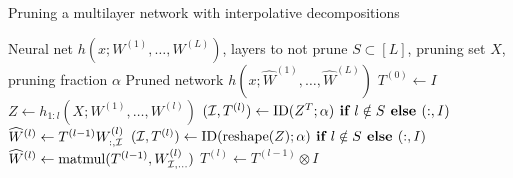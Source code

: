 \begin{algorithm}[t]{\small
\caption{Pruning a multilayer network with interpolative decompositions}
\begin{algorithmic}[1]
\label{alg:deepID}
\REQUIRE
Neural net $h(x; W^{(1)},\ldots,W^{(L)})$,
layers to not prune $S \subset [L]$,
pruning set $X$,
pruning fraction $\alpha$
\ENSURE
Pruned network $h(x; \widehat{W}^{(1)},\ldots,\widehat{W}^{(L)})$
\vspace{0.5em}
\STATE $T^{(0)} \gets I$ \;
\STATE $Z \gets h_{1:l}(X; W^{(1)}, \dots, W^{(l)})$
\STATE $(\mathcal{I}, T^{(l)}) \gets \operatorname{ID}(Z^T; \alpha) \textbf{ if } l \notin S \textbf{ else } (:, I)$ \;
\STATE $\widehat{W}^{(l)} \gets T^{(l-1)} W^{(l)}_{:,\mathcal{I}}$
\STATE $(\mathcal{I}, T^{(l)}) \gets \operatorname{ID}(\operatorname{reshape}(Z); \alpha) \textbf{ if } l \notin S \textbf{ else } (:, I)$ \;
\STATE $\widehat{W}^{(l)} \gets \operatorname{matmul}(T^{(l-1)}, W^{(l)}_{\mathcal{I},\ldots})$
\STATE $T^{(l)} \gets T^{(l-1)} \otimes I \,\,$ 
\ENDIF
\ENDFOR
\end{algorithmic}
}\end{algorithm}


